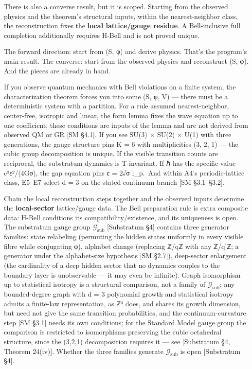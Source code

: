 \documentclass[
]{article}
\begin{document}
There is also a converse result, but it is scoped. Starting from the
observed physics and the theorem's structural inputs, within the
nearest-neighbor class, the reconstruction fixes the \textbf{local
lattice/gauge residue}. A Bell-inclusive full completion additionally
requires H-Bell and is not proved unique.

The forward direction: start from (S, φ) and derive physics. That's the
program's main result. The converse: start from the observed physics and
reconstruct (S, φ). And the pieces are already in hand.

If you observe quantum mechanics with Bell violations on a finite
system, the characterization theorem forces you into some (S, φ, V) ---
there must be a deterministic system with a partition. For a rule
assumed nearest-neighbor, center-free, isotropic and linear, the form
lemma fixes the wave equation up to one coefficient; these conditions
are inputs of the lemma and are not derived from observed QM or GR {[}SM
§4.1{]}. If you see SU(3) × SU(2) × U(1) with three generations, the
gauge structure pins K = 6 with multiplicities (3, 2, 1) --- the cubic
group decomposition is unique. If the visible transition counts are
reciprocal, the substratum dynamics is T-invariant. If ℏ has the
specific value c³ε²/(4Gσ), the gap equation pins ε = 2√σ l\_p.~And
within A4's periodic-lattice class, E5--E7 select d = 3 on the stated
continuum branch {[}SM §3.1--§3.2{]}.

Chain the local reconstruction steps together and the observed inputs
determine the \textbf{local-sector} lattice/gauge data. The Bell
preparation rule is extra composite data: H-Bell conditions its
compatibility/existence, and its uniqueness is open. The substratum
gauge group \(\mathcal{G}_{\text{sub}}\) {[}Substratum §4{]} contains
three generator families: state relabeling (permuting the hidden states
uniformly in every visible fibre while conjugating φ), alphabet change
(replacing ℤ/qℤ with any ℤ/q'ℤ; a generator under the alphabet-size
hypothesis {[}SM §2.7{]}), deep-sector enlargement (the cardinality of a
deep hidden sector that no dynamics couples to the boundary layer is
unobservable --- it may even be infinite). Graph isomorphism up to
statistical isotropy is a structural comparison, not a family of
\(\mathcal{G}_{\text{sub}}\): any bounded-degree graph with d = 3
polynomial growth and statistical isotropy admits a finite-law
representation, as ℤ³ does, and shares its growth dimension, but need
not give the same transition probabilities, and the continuum-curvature
step {[}SM §3.1{]} needs its own conditions; for the Standard Model
gauge group the comparison is restricted to isomorphisms preserving the
cubic octahedral structure, since the (3,2,1) decomposition requires it
--- see {[}Substratum §4, Theorem 24(iv){]}. Whether the three families
generate \(\mathcal{G}_{\text{sub}}\) is open {[}Substratum §4{]}.
\end{document}
